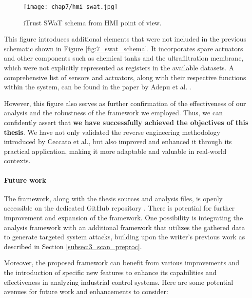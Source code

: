 \begin{figure}[ht]
	\centering
	\texttt{[image: chap7/hmi\_swat.jpg]}
	\caption{iTrust SWaT schema from HMI point of view.}
	\label{fig:7_swat_hmi}
\end{figure}

\bigskip
This figure introduces additional elements that were not included in the previous schematic shown in Figure \ref{fig:7_swat_schema}. It incorporates spare actuators and other components such as chemical tanks and the ultrafiltration membrane, which were not explicitly represented as registers in the available datasets. A comprehensive list of sensors and actuators, along with their respective functions within the system, can be found in the paper by Adepu et al. \cite{swat_dataset2015}.

However, this figure also serves as further confirmation of the effectiveness of our analysis and the robustness of the framework we employed. Thus, we can confidently assert that \textbf{we have successfully achieved the objectives of this thesis}. We have not only validated the reverse engineering methodology introduced by Ceccato et al., but also improved and enhanced it through its practical application, making it more adaptable and valuable in real-world contexts.

\paragraph{Future work}
\label{par:7_futurework}
The framework, along with the thesis sources and analysis files, is openly accessible on the dedicated GitHub repository \cite{repository_tesi}. There is potential for further improvement and expansion of the framework. One possibility is integrating the analysis framework with an additional framework that utilizes the gathered data to generate targeted system attacks, building upon the writer's previous work as described in Section \ref{subsec:3_scan_preproc}.

Moreover, the proposed framework can benefit from various improvements and the introduction of specific new features to enhance its capabilities and effectiveness in analyzing industrial control systems. Here are some potential avenues for future work and enhancements to consider:

